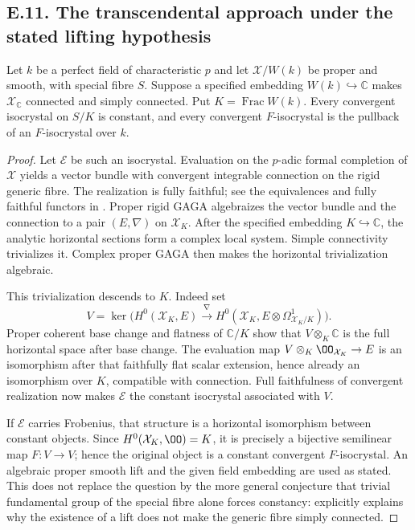 \subsection{E.11. The transcendental approach under the stated lifting hypothesis}

\begin{theorem}\label{thm:DE-simply-connected-convergent}
Let $k$ be a perfect field of characteristic $p$ and let $\mathcal X/W(k)$ be proper and smooth, with special fibre $S$.  Suppose a specified embedding $W(k)\hookrightarrow\mathbb C$ makes $\mathcal X_{\mathbb C}$ connected and simply connected.  Put $K=\operatorname{Frac}W(k)$.  Every convergent isocrystal on $S/K$ is constant, and every convergent $F$-isocrystal is the pullback of an $F$-isocrystal over $k$.
\end{theorem}
\begin{proof}
Let $\mathcal E$ be such an isocrystal.  Evaluation on the $p$-adic formal completion of $\mathcal X$ yields a vector bundle with convergent integrable connection on the rigid generic fibre.  The realization is fully faithful; see the equivalences and fully faithful functors in \cite[\S1, (1.13), (1.24)--(1.26)]{EsnaultShiho2018}.  Proper rigid GAGA algebraizes the vector bundle and the connection to a pair $(E,\nabla)$ on $\mathcal X_K$.  After the specified embedding $K\hookrightarrow\mathbb C$, the analytic horizontal sections form a complex local system.  Simple connectivity trivializes it.  Complex proper GAGA then makes the horizontal trivialization algebraic.

This trivialization descends to $K$.  Indeed set
\[
 V=\ker\bigl(H^0(\mathcal X_K,E)\xrightarrow{\nabla}
                H^0(\mathcal X_K,E\otimes\Omega^1_{\mathcal X_K/K})\bigr).
\]
Proper coherent base change and flatness of $\mathbb C/K$ show that $V\otimes_K\mathbb C$ is the full horizontal space after base change.  The evaluation map $V\otimes_K\OO_{\mathcal X_K}\to E$ is an isomorphism after that faithfully flat scalar extension, hence already an isomorphism over $K$, compatible with connection.  Full faithfulness of convergent realization now makes $\mathcal E$ the constant isocrystal associated with $V$.

If $\mathcal E$ carries Frobenius, that structure is a horizontal isomorphism between constant objects.  Since $H^0(\mathcal X_K,\OO)=K$, it is precisely a bijective semilinear map $F:V\to V$; hence the original object is a constant convergent $F$-isocrystal.  An algebraic proper smooth lift and the given field embedding are used as stated.  This does not replace the question by the more general conjecture that trivial \etale fundamental group of the special fibre alone forces constancy: \cite[Introduction]{EsnaultShiho2018} explicitly explains why the existence of a lift does not make the generic fibre simply connected.
\end{proof}

